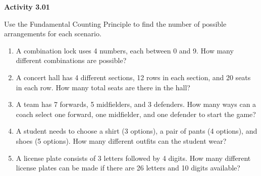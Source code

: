 \vspace{0.3ex}
\noindent\textbf{Activity 3.01}

\vspace{0.2ex}

Use the Fundamental Counting Principle to find the number of possible arrangements for each scenario.

\begin{enumerate}[label=\color{blue}\arabic*.]
    \item A combination lock uses 4 numbers, each between 0 and 9. How many different combinations are possible?
    \item A concert hall has 4 different sections, 12 rows in each section, and 20 seats in each row. How many total seats are there in the hall?
    \item A team has 7 forwards, 5 midfielders, and 3 defenders. How many ways can a coach select one forward, one midfielder, and one defender to start the game?
    \item A student needs to choose a shirt (3 options), a pair of pants (4 options), and shoes (5 options). How many different outfits can the student wear?
    \item A license plate consists of 3 letters followed by 4 digits. How many different license plates can be made if there are 26 letters and 10 digits available?
\end{enumerate}
